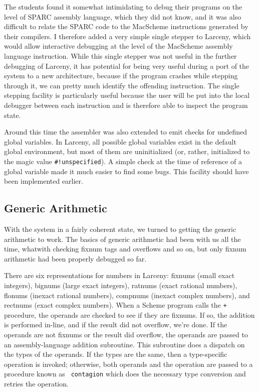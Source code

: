 The students found it somewhat intimidating to debug their programs on the
level of SPARC assembly language, which they did not know, and it was also
difficult to relate the SPARC code to the MacScheme instructions generated
by their compilers. I therefore added a very simple single stepper to
Larceny, which would allow interactive debugging at the level of the
MacScheme assembly language instruction. While this single stepper was not
useful in the further debugging of Larceny, it has potential for being very
useful during a port of the system to a new architecture, because if the
program crashes while stepping through it, we can pretty much identify the
offending instruction. The single stepping facility is particularly useful
because the user will be put into the local debugger between each
instruction and is therefore able to inspect the program state.

Around this time the assembler was also extended to emit checks for undefined
global variables. In Larceny, all possible global variables exist in the
default global environment, but most of them are uninitialized (or, rather,
initialized to the magic value \verb+#!unspecified+). A simple check at
the time of reference of a global variable made it much easier to find
some bugs. This facility should have been implemented earlier.

\subsection{Generic Arithmetic}

With the system in a fairly coherent state, we turned to getting the generic
arithmetic to work. The basics of generic arithmetic had been with us all
the time, whatwith checking fixnum tags and overflows and so on, but 
only fixnum arithmetic had been properly debugged so far.

There are six representations for numbers in Larceny: fixnums (small exact
integers), bignums (large exact integers), ratnums (exact rational numbers),
flonums (inexact rational numbers), compnums (inexact complex numbers), and
rectnums (exact complex numbers). When a Scheme program calls the {\tt +}
procedure, the operands are checked to see if they are fixnums. If so, the
addition is performed in-line, and if the result did not overflow, we're
done.  If the operands are not fixnums or the result did overflow, the
operands are passed to an assembly-language addition subroutine. This
subroutine does a dispatch on the types of the operands. If the types are
the same, then a type-specific operation is invoked; otherwise, both
operands and the operation are passed to a procedure known as {\tt
contagion} which does the necessary type conversion and retries the
operation.

